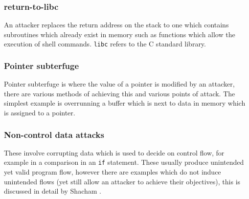 \subsubsection{return-to-libc}

An attacker replaces the return address on the stack to one which contains subroutines which already exist in memory such as functions which allow the execution of shell commands. \verb|libc| refers to the C standard library.

\subsubsection{Pointer subterfuge}

Pointer subterfuge is where the value of a pointer is modified by an attacker, there are various methods of achieving this and various points of attack. The simplest example is overrunning a buffer which is next to data in memory which is assigned to a pointer.

\subsubsection{Non-control data attacks}
These involve corrupting data which is used to decide on control flow, for example in a comparison in an \verb|if| statement. These usually produce unintended yet valid program flow, however there are examples which do not induce unintended flows (yet still allow an attacker to achieve their objectives), this is discussed in detail by Shacham \cite{Shacham2007}.